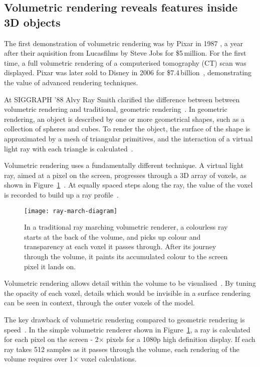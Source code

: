 \subsection{Volumetric rendering reveals features inside 3D objects} \label{sec:volumerendering}
The first demonstration of volumetric rendering was by Pixar in 1987 \cite{smith1987volume}, a year after their aquisition from Lucasfilms by Steve Jobs for \$5\,million.
For the first time, a full volumetric rendering of a computerised tomography (CT) scan was displayed.
Pixar was later sold to Disney in 2006 for \$7.4\,billion~\cite{pixar2007story, pixar2018our}, demonstrating the value of advanced rendering techniques. 

At SIGGRAPH '88 Alvy Ray Smith clarified the difference between between volumetric rendering and traditional, geometric rendering~\cite{siggraph1988panel}.
In geometric rendering, an object is described by one or more geometrical shapes, such as a collection of spheres and cubes.
To render the object, the surface of the shape is approximated by a mesh of triangular primitives, and the interaction of a virtual light ray with each triangle is calculated~\cite{buss20033d}. 

Volumetric rendering uses a fundamentally different technique.
A virtual light ray, aimed at a pixel on the screen, progresses through a 3D array of voxels, as shown in Figure~\ref{fig:raymarch-diagram}~\cite{tuy1984direct}.
At equally spaced steps along the ray, the value of the voxel is recorded to build up a ray profile~\cite{levoy1988display}.

\begin{figure}[htbp!]
\centering
\texttt{[image: ray-march-diagram]}
\caption[FPBioimage: Raymarching facilitates volumetric rendering of 3D data]{In a traditional ray marching volumetric renderer, a colourless ray starts at the back of the volume, and picks up colour and transparency at each voxel it passes through. After its journey through the volume, it paints its accumulated colour to the screen pixel it lands on. }
\label{fig:raymarch-diagram}
\end{figure}

Volumetric rendering allows detail within the volume to be visualised~\cite{drebin1988volume}. 
By tuning the opacity of each voxel, details which would be invisible in a surface rendering can be seen in context, through the outer voxels of the model. 

The key drawback of volumetric rendering compared to geometric rendering is speed~\cite{dachille1998high}. 
In the simple volumetric renderer shown in Figure~\ref{fig:raymarch-diagram}, a ray is calculated for each pixel on the screen - 2$\times$ pixels for a 1080p high definition display. 
If each ray takes \num{512} samples as it passes through the volume, each rendering of the volume requires over 1$\times$ voxel calculations. 

